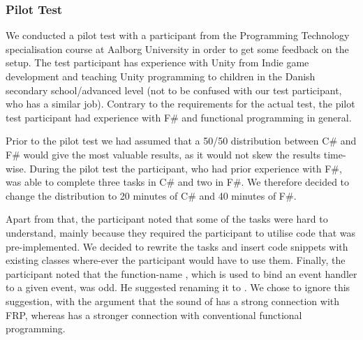 \subsubsection{Pilot Test}
We conducted a pilot test with a participant from the Programming Technology specialisation course at Aalborg University in order to get some feedback on the setup. The test participant has experience with Unity from Indie game development and teaching Unity programming to children in the Danish secondary school/advanced level (not to be confused with our test participant, who has a similar job). Contrary to the requirements for the actual test, the pilot test participant had experience with F\# and functional programming in general.

Prior to the pilot test we had assumed that a 50/50 distribution between C\# and F\# would give the most valuable results, as it would not skew the results time-wise. During the pilot test the participant, who had prior experience with F\#, was able to complete three tasks in C\# and two in F\#. We therefore decided to change the distribution to 20 minutes of C\# and 40 minutes of F\#.

Apart from that, the participant noted that some of the tasks were hard to understand, mainly because they required the participant to utilise code that was pre-implemented. We decided to rewrite the tasks and insert code snippets with existing classes where-ever the participant would have to use them. Finally, the participant noted that the function-name , which is used to bind an event handler to a given event, was odd. He suggested renaming it to . We chose to ignore this suggestion, with the argument that the sound of  has a strong connection with \gls{FRP}, whereas  has a stronger connection with conventional functional programming.
